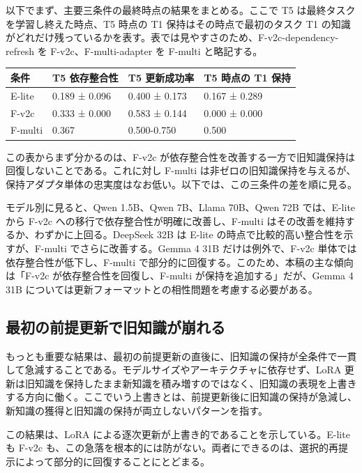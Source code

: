 \documentclass[12pt,a4paper]{article}
\begin{document}
以下でまず、主要三条件の最終時点の結果をまとめる。ここで T5 は最終タスクを学習し終えた時点、T5 時点の T1 保持はその時点で最初のタスク T1 の知識がどれだけ残っているかを表す。表では見やすさのため、F-v2c-dependency-refresh を F-v2c、F-multi-adapter を F-multi と略記する。

{\def\LTcaptype{table} %
\begin{longtable}[]{@{}llll@{}}
\toprule\noalign{}
条件 & T5 依存整合性 & T5 更新成功率 & T5 時点の T1 保持 \\
\midrule\noalign{}
\endhead
\bottomrule\noalign{}
\endlastfoot
E-lite & 0.189 ± 0.096 & 0.400 ± 0.173 & 0.167 ± 0.289 \\
F-v2c & 0.333 ± 0.000 & 0.583 ± 0.144 & 0.000 ± 0.000 \\
F-multi & 0.367 & 0.500-0.750 & 0.500 \\
\end{longtable}
}

この表からまず分かるのは、F-v2c が依存整合性を改善する一方で旧知識保持は回復しないことである。これに対し F-multi は非ゼロの旧知識保持を与えるが、保持アダプタ単体の忠実度はなお低い。以下では、この三条件の差を順に見る。

モデル別に見ると、Qwen 1.5B、Qwen 7B、Llama 70B、Qwen 72B では、E-lite から F-v2c への移行で依存整合性が明確に改善し、F-multi はその改善を維持するか、わずかに上回る。DeepSeek 32B は E-lite の時点で比較的高い整合性を示すが、F-multi でさらに改善する。Gemma 4 31B だけは例外で、F-v2c 単体では依存整合性が低下し、F-multi で部分的に回復する。このため、本稿の主な傾向は「F-v2c が依存整合性を回復し、F-multi が保持を追加する」だが、Gemma 4 31B については更新フォーマットとの相性問題を考慮する必要がある。

\subsection{最初の前提更新で旧知識が崩れる}\label{ux6700ux521dux306eux524dux63d0ux66f4ux65b0ux3067ux65e7ux77e5ux8b58ux304cux5d29ux308cux308b}

もっとも重要な結果は、最初の前提更新の直後に、旧知識の保持が全条件で一貫して急減することである。モデルサイズやアーキテクチャに依存せず、LoRA 更新は旧知識を保持したまま新知識を積み増すのではなく、旧知識の表現を上書きする方向に働く。ここでいう上書きとは、前提更新後に旧知識の保持が急減し、新知識の獲得と旧知識の保持が両立しないパターンを指す。

この結果は、LoRA による逐次更新が上書き的であることを示している。E-lite も F-v2c も、この急落を根本的には防がない。両者にできるのは、選択的再提示によって部分的に回復することにとどまる。
\end{document}
